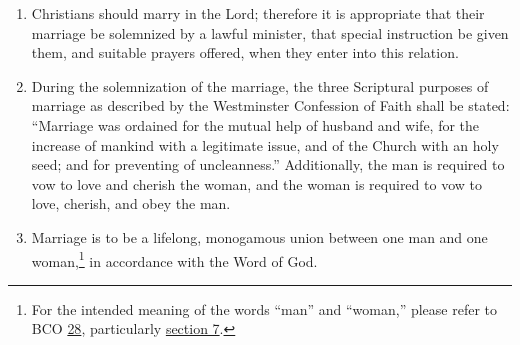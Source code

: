 \documentclass[
]{book}
\providecommand{\tightlist}{%
  \setlength{\itemsep}{0pt}\setlength{\parskip}{0pt}}
\begin{document}
\begin{enumerate}
\def\labelenumi{\arabic{enumi}.}
\setcounter{enumi}{1}
\tightlist
\item
  Christians should marry in the Lord; therefore it is appropriate that their marriage be solemnized by a lawful minister, that special instruction be given them, and suitable prayers offered, when they enter into this relation.
\item
  \protect\hypertarget{72.3}{\href{}{}}During the solemnization of the marriage, the three Scriptural purposes of marriage as described by the Westminster Confession of Faith shall be stated: ``Marriage was ordained for the mutual help of husband and wife, for the increase of mankind with a legitimate issue, and of the Church with an holy seed; and for preventing of uncleanness.'' Additionally, the man is required to vow to love and cherish the woman, and the woman is required to vow to love, cherish, and obey the man.
\item
  Marriage is to be a lifelong, monogamous union between one man and one woman,\footnote{For the intended meaning of the words ``man'' and ``woman,'' please refer to BCO \protect\hyperlink{28}{28}, particularly \protect\hyperlink{28.7}{section 7}.} in accordance with the Word of God.
\end{enumerate}
\end{document}

